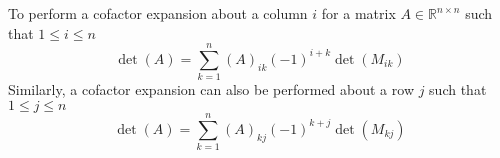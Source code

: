 \documentclass{report}
\begin{document}
\noindent To perform a cofactor expansion about a column $i$ for a matrix $A\in\mathbb{R}^{n\times n}$ such that $1 \le i \le n$
$$
\det(A) = \sum_{k=1}^n (A)_{ik}(-1)^{i+k} \det(M_{ik})
$$
Similarly, a cofactor expansion can also be performed about a row $j$ such that $1 \le j \le n$
$$
\det(A) = \sum_{k=1}^n (A)_{kj}(-1)^{k+j} \det(M_{kj})
$$
\end{document}
